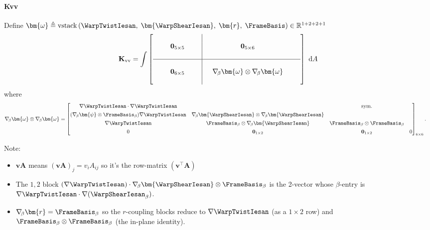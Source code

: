 \paragraph{Kvv}
Define \(\bm{\omega} \triangleq \operatorname{vstack} \left(
\WarpTwistIesan,\;\bm{\WarpShearIesan},\;\bm{r},\;\FrameBasis
\right)\in\mathbb{R}^{1+2+2+1}\)
\begin{equation}
\mathbf{K}_{\rm vv} 
= \int \left[\begin{array}{ccc|cccc}
\quad & & \quad &  & & & \\
& \mathbf{0}_{5\times5} &  & & \mathbf{0}_{5\times6} &  & \\
& & & & & &  \\ \hline
& & & & & \\
& \mathbf{0}_{6\times5} & & & \nabla_{\!\beta}\bm{\omega}\otimes\nabla_{\!\beta} \bm{\omega} & & \\
& & & & & &
\end{array}\right]\mathrm{~d}A
\end{equation}
where
\[
\begin{aligned}
\nabla_{\!\beta}\bm{\omega}\otimes\nabla_{\!\beta}\bm{\omega}
&=\begin{bmatrix}
 \nabla\WarpTwistIesan\cdot\nabla\WarpTwistIesan  
 & 
 & \text{sym.}
 &
\\[4pt] 
(\nabla_{\!\beta}\bm{\psi}\otimes\FrameBasis_{\beta})\nabla \WarpTwistIesan
& \nabla_{\!\beta}\bm{\WarpShearIesan}\otimes\nabla_{\!\beta}\bm{\WarpShearIesan} 
& %
& %
\\[4pt]
\nabla\WarpTwistIesan & 
 \FrameBasis_{\beta}\otimes\nabla_{\!\beta}\bm{\WarpShearIesan}  & 
 \FrameBasis_{\beta}\otimes\FrameBasis_{\beta}  
 & %
 \\[4pt]
0 & \mathbf{0}_{1\times2} & \mathbf{0}_{1\times2} & 0
\end{bmatrix}_{6\times 6}.
\end{aligned}
\]


Note:
\begin{itemize}
\item $\mathbf{v} \mathbf{A}$ means $(\mathbf{v} \mathbf{A})_j=v_i A_{i j}$ so it's the row-matrix $\left(\mathbf{v}^{\top} \mathbf{A}\right)$
\item The \(1,2\) block \((\nabla\WarpTwistIesan)\cdot\nabla_{\!\beta}\bm{\WarpShearIesan}\otimes\FrameBasis_{\beta}\) is the 2-vector whose \(\beta\)-entry is \(\nabla\WarpTwistIesan\cdot\nabla(\WarpShearIesan_{\beta})\).  
\item \(\nabla_{\!\beta}\bm{r}=\FrameBasis_{\beta}\) so the \(r\)-coupling blocks reduce to \(\nabla\WarpTwistIesan\) (as a \(1\times2\) row) and \(\FrameBasis_{\beta}\otimes\FrameBasis_{\beta}\) (the in-plane identity).
\end{itemize}

